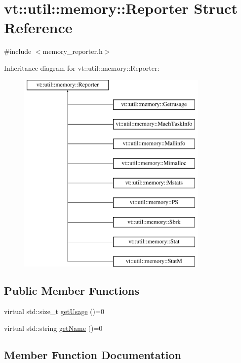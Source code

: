 \hypertarget{structvt_1_1util_1_1memory_1_1_reporter}{}\section{vt\+:\+:util\+:\+:memory\+:\+:Reporter Struct Reference}
\label{structvt_1_1util_1_1memory_1_1_reporter}


{\ttfamily \#include $<$memory\+\_\+reporter.\+h$>$}

Inheritance diagram for vt\+:\+:util\+:\+:memory\+:\+:Reporter\+:\begin{figure}[H]
\begin{center}
\leavevmode
\includegraphics[height=10.000000cm]{structvt_1_1util_1_1memory_1_1_reporter}
\end{center}
\end{figure}
\subsection*{Public Member Functions}
\begin{DoxyCompactItemize}
\item 
virtual std\+::size\+\_\+t \hyperlink{structvt_1_1util_1_1memory_1_1_reporter_a372574f51fdb68077cd3d227ee373de5}{get\+Usage} ()=0
\item 
virtual std\+::string \hyperlink{structvt_1_1util_1_1memory_1_1_reporter_a83fc36e9cff3ce2deedf1d4546694713}{get\+Name} ()=0
\end{DoxyCompactItemize}


\subsection{Member Function Documentation}
\mbox{\label{structvt_1_1util_1_1memory_1_1_reporter_a83fc36e9cff3ce2deedf1d4546694713}} 
